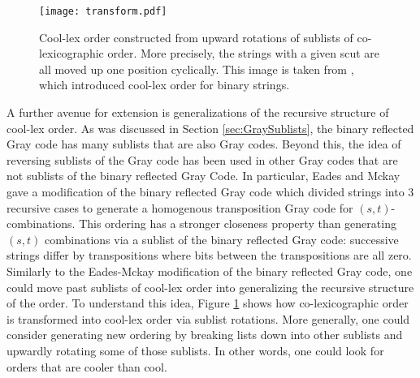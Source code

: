 \begin{figure}
\begin{center}
        \texttt{[image: transform.pdf]}
\end{center}
        \cprotect\caption[Cool-lex order constructed from upward rotations of sublists of co-lexicographic order.]{Cool-lex order constructed from upward rotations of sublists of co-lexicographic order.  More precisely, the strings with a given scut are all moved up one position cyclically.  This image is taken from \cite{ruskey2005generating,ruskey2009coolest}, which introduced cool-lex order for binary strings. }
\label{fig:cooltransform}
\end{figure}

A further avenue for extension is generalizations of the recursive structure of cool-lex order.  As was discussed in Section \ref{sec:GraySublists}, the binary reflected Gray code has many sublists that are also Gray codes.  Beyond this, the idea of reversing sublists of the Gray code has been used in other Gray codes that are not sublists of the binary reflected Gray Code.  In particular, Eades and Mckay gave a modification of the binary reflected Gray code which divided strings into 3 recursive cases to generate a homogenous transposition Gray code for $(s,t)$-combinations. This ordering has a stronger closeness property than generating $(s,t)$ combinations via a sublist of the binary reflected Gray code: successive strings differ by transpositions where bits between the transpositions are all zero.  Similarly to the Eades-Mckay modification of the binary reflected Gray code, one could move past sublists of cool-lex order into generalizing the recursive structure of the order.  To understand this idea, Figure \ref{fig:cooltransform} shows how co-lexicographic order is transformed into cool-lex order via sublist rotations.  More generally, one could consider generating new ordering by breaking lists down into other sublists and upwardly rotating some of those sublists. In other words, one could look for orders that are cooler than cool. 
